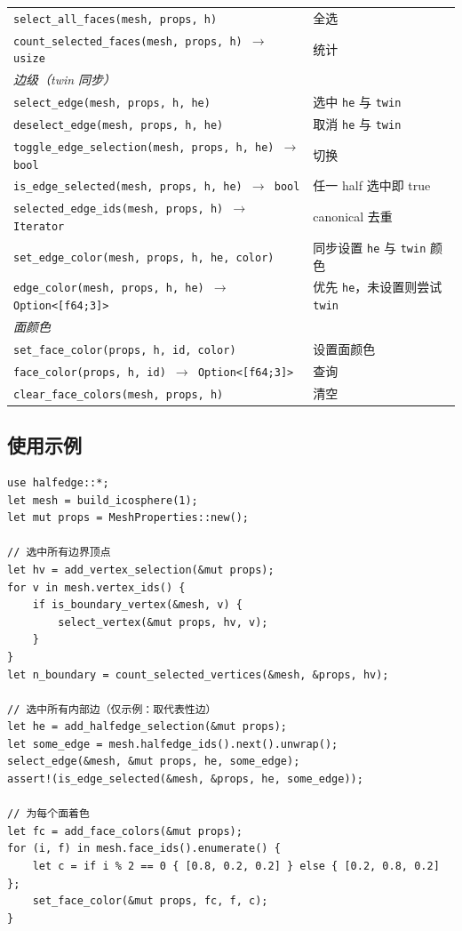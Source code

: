 \documentclass[11pt,a4paper]{article}
\begin{document}
\begin{longtable}{@{}ll@{}}
  \texttt{select\_all\_faces(mesh, props, h)}                & 全选 \\
  \texttt{count\_selected\_faces(mesh, props, h) $\to$ usize} & 统计 \\
  \midrule
  \multicolumn{2}{l}{\textit{边级（twin 同步）}} \\
  \texttt{select\_edge(mesh, props, h, he)}                  & 选中 \texttt{he} 与 \texttt{twin} \\
  \texttt{deselect\_edge(mesh, props, h, he)}                & 取消 \texttt{he} 与 \texttt{twin} \\
  \texttt{toggle\_edge\_selection(mesh, props, h, he) $\to$ bool} & 切换 \\
  \texttt{is\_edge\_selected(mesh, props, h, he) $\to$ bool} & 任一 half 选中即 true \\
  \texttt{selected\_edge\_ids(mesh, props, h) $\to$ Iterator} & canonical 去重 \\
  \texttt{set\_edge\_color(mesh, props, h, he, color)}       & 同步设置 \texttt{he} 与 \texttt{twin} 颜色 \\
  \texttt{edge\_color(mesh, props, h, he) $\to$ Option<[f64;3]>} & 优先 \texttt{he}，未设置则尝试 \texttt{twin} \\
  \midrule
  \multicolumn{2}{l}{\textit{面颜色}} \\
  \texttt{set\_face\_color(props, h, id, color)}              & 设置面颜色 \\
  \texttt{face\_color(props, h, id) $\to$ Option<[f64;3]>}    & 查询 \\
  \texttt{clear\_face\_colors(mesh, props, h)}                & 清空 \\
  \bottomrule
\end{longtable}

\subsection{使用示例}

\begin{lstlisting}
use halfedge::*;
let mesh = build_icosphere(1);
let mut props = MeshProperties::new();

// 选中所有边界顶点
let hv = add_vertex_selection(&mut props);
for v in mesh.vertex_ids() {
    if is_boundary_vertex(&mesh, v) {
        select_vertex(&mut props, hv, v);
    }
}
let n_boundary = count_selected_vertices(&mesh, &props, hv);

// 选中所有内部边（仅示例：取代表性边）
let he = add_halfedge_selection(&mut props);
let some_edge = mesh.halfedge_ids().next().unwrap();
select_edge(&mesh, &mut props, he, some_edge);
assert!(is_edge_selected(&mesh, &props, he, some_edge));

// 为每个面着色
let fc = add_face_colors(&mut props);
for (i, f) in mesh.face_ids().enumerate() {
    let c = if i % 2 == 0 { [0.8, 0.2, 0.2] } else { [0.2, 0.8, 0.2] };
    set_face_color(&mut props, fc, f, c);
}
\end{lstlisting}
\end{document}
